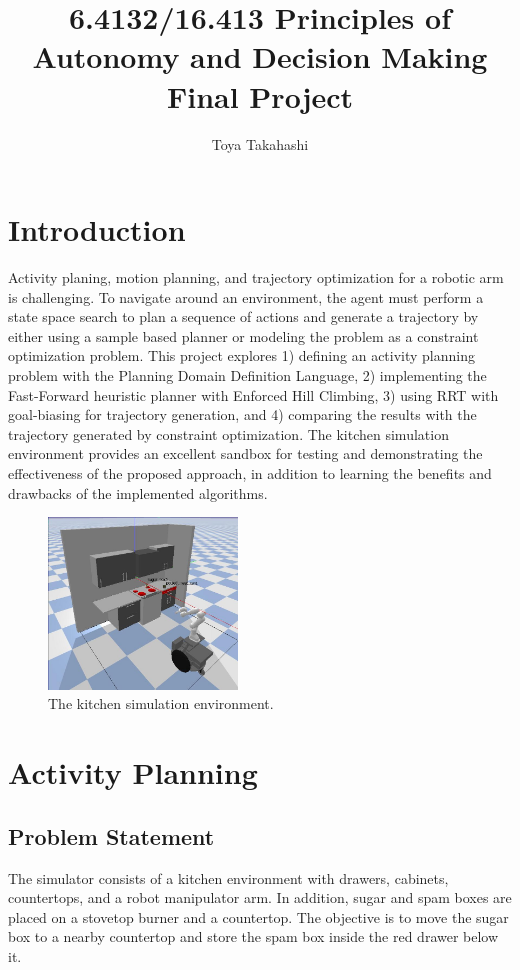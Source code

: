 \documentclass{article}
\title{6.4132/16.413 Principles of Autonomy and Decision Making Final Project}
\author[ ]{Toya Takahashi}
\affil[ ]{Massachusetts Institute of Technology}
\affil[ ]{Department of Aeronautics and Astronautics}
\begin{document}
\maketitle

\section{Introduction}

Activity planing, motion planning, and trajectory optimization for a robotic arm is challenging. To navigate around an environment, the agent must perform a state space search to plan a sequence of actions and generate a trajectory by either using a sample based planner or modeling the problem as a constraint optimization problem. This project explores 1) defining an activity planning problem with the Planning Domain Definition Language, 2) implementing the Fast-Forward heuristic planner with Enforced Hill Climbing, 3) using RRT with goal-biasing for trajectory generation, and 4) comparing the results with the trajectory generated by constraint optimization. The kitchen simulation environment provides an excellent sandbox for testing and demonstrating the effectiveness of the proposed approach, in addition to learning the benefits and drawbacks of the implemented algorithms.

\begin{figure}[h]
    \centering
    \includegraphics[width=190px]{sim_env.jpg}
    \caption{The kitchen simulation environment.}
    \label{fig:sim_env}
\end{figure}

\section{Activity Planning}

\iffalse
\subsection{Problem Statement}

The simulator consists of a kitchen environment with drawers, cabinets, countertops, and a robot manipulator arm. In addition, sugar and spam boxes are placed on a stovetop burner and a countertop. The objective is to move the sugar box to a nearby countertop and store the spam box inside the red drawer below it.
\end{document}
